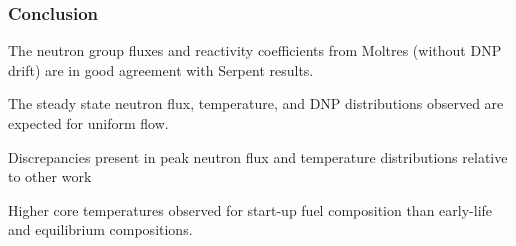 \begin{frame}
	\frametitle{Conclusion}
		The neutron group fluxes and reactivity coefficients from Moltres
		(without \gls{DNP} drift) are in
		good agreement with Serpent results.
		
		\vspace{.3cm}
		The steady state neutron flux, temperature, and \gls{DNP} distributions
		observed are expected for uniform flow.
		
		\vspace{.3cm}
		Discrepancies present in peak neutron
		flux and temperature distributions relative to other work
		
		\vspace{.3cm}
		Higher core temperatures observed for start-up fuel composition than
		early-life and equilibrium compositions.
\end{frame}